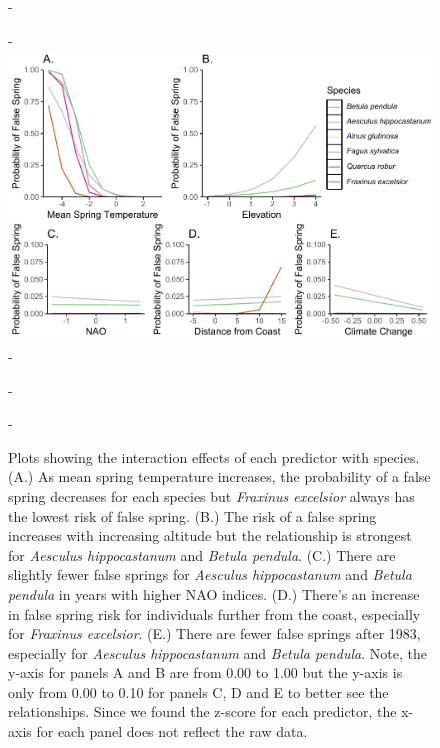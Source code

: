 \documentclass{article}\usepackage[]{graphicx}\usepackage[]{color}
\begin{document}
{\begin{figure} [H]
  -\begin{center}
  -\includegraphics[width=16cm]{..//figures/InteractionPlots/Species_bernie.pdf}
  -\caption{Plots showing the interaction effects of each predictor with species. (A.) As mean spring temperature increases, the probability of a false spring decreases for each species but \textit{Fraxinus excelsior} always has the lowest risk of false spring. (B.) The risk of a false spring increases with increasing altitude but the relationship is strongest for \textit{Aesculus hippocastanum} and \textit{Betula pendula}. (C.) There are slightly fewer false springs for \textit{Aesculus hippocastanum} and \textit{Betula pendula} in years with higher NAO indices. (D.) There's an increase in false spring risk for individuals further from the coast, especially for \textit{Fraxinus excelsior}. (E.) There are fewer false springs after 1983, especially for \textit{Aesculus hippocastanum} and \textit{Betula pendula}. Note, the y-axis for panels A and B are from 0.00 to 1.00 but the y-axis is only from 0.00 to 0.10 for panels C, D and E to better see the relationships. Since we found the z-score for each predictor, the x-axis for each panel does not reflect the raw data.}\label{fig:spp}
  -\end{center}
  -\end{figure}}

  
\end{document}
